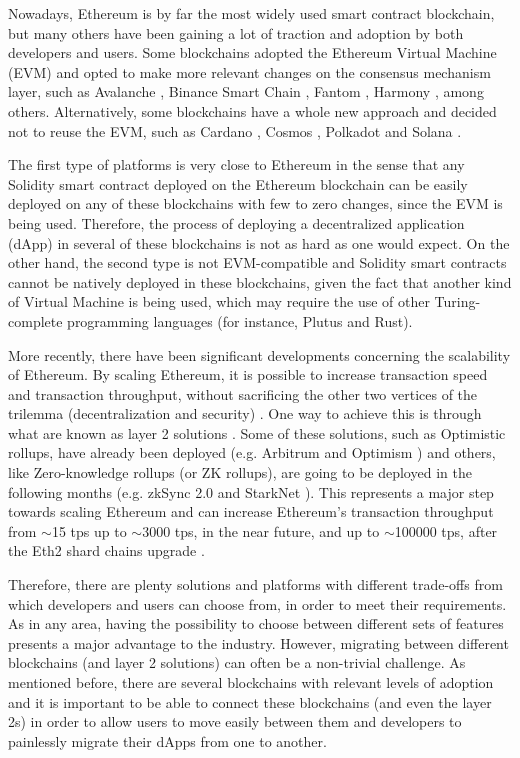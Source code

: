 \documentclass[runningheads]{llncs}
\begin{document}
Nowadays, Ethereum is by far the most widely used smart contract blockchain, but many others have been gaining a lot of traction and adoption by both developers and users. Some blockchains adopted the Ethereum Virtual Machine (EVM) \cite{buterin_2014} and opted to make more relevant changes on the consensus mechanism layer, such as Avalanche \cite{sekniqi_laine_buttolph_sirer_2020}, Binance Smart Chain \cite{binance_2020}, Fantom \cite{choi_park_nguyen_cronje_2018}, Harmony \cite{harmony}, among others. Alternatively, some blockchains have a whole new approach and decided not to reuse the EVM, such as Cardano \cite{cardano}, Cosmos \cite{cosmos}, Polkadot \cite{wood} and Solana \cite{yakovenko}.

The first type of platforms is very close to Ethereum in the sense that any Solidity smart contract deployed on the Ethereum blockchain can be easily deployed on any of these blockchains with few to zero changes, since the EVM is being used. Therefore, the process of deploying a decentralized application (dApp) in several of these blockchains is not as hard as one would expect. On the other hand, the second type is not EVM-compatible and Solidity smart contracts cannot be natively deployed in these blockchains, given the fact that another kind of Virtual Machine is being used, which may require the use of other Turing-complete programming languages (for instance, Plutus and Rust).

More recently, there have been significant developments concerning the scalability of Ethereum. By scaling Ethereum, it is possible to increase transaction speed and transaction throughput, without sacrificing the other two vertices of the trilemma (decentralization and security) \cite{buterin_2021}. One way to achieve this is through what are known as layer 2 solutions \cite{buterin_2021_2}. Some of these solutions, such as Optimistic rollups, have already been deployed (e.g. Arbitrum \cite{offchainlabs} and Optimism \cite{optimism}) and others, like Zero-knowledge rollups (or ZK rollups), are going to be deployed in the following months (e.g. zkSync 2.0 \cite{zksync} and StarkNet \cite{starkware}). This represents a major step towards scaling Ethereum and can increase Ethereum's transaction throughput from \(\sim\)15 tps up to \(\sim\)3000 tps, in the near future, and up to \(\sim\)100000 tps, after the Eth2 shard chains upgrade \cite{buterin_2020}.

Therefore, there are plenty solutions and platforms with different trade-offs from which developers and users can choose from, in order to meet their requirements. As in any area, having the possibility to choose between different sets of features presents a major advantage to the industry. However, migrating between different blockchains (and layer 2 solutions) can often be a non-trivial challenge. As mentioned before, there are several blockchains with relevant levels of adoption and it is important to be able to connect these blockchains (and even the layer 2s) in order to allow users to move easily between them and developers to painlessly migrate their dApps from one to another.
\end{document}
